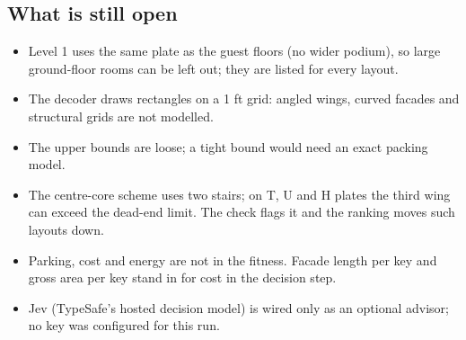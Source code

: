 \subsection{What is still open}
\begin{itemize}
\item Level 1 uses the same plate as the guest floors (no wider podium), so large ground-floor rooms can be left out; they are listed for every layout.
\item The decoder draws rectangles on a 1 ft grid: angled wings, curved facades and structural grids are not modelled.
\item The upper bounds are loose; a tight bound would need an exact packing model.
\item The centre-core scheme uses two stairs; on T, U and H plates the third wing can exceed the dead-end limit. The check flags it and the ranking moves such layouts down.
\item Parking, cost and energy are not in the fitness. Facade length per key and gross area per key stand in for cost in the decision step.
\item Jev (TypeSafe's hosted decision model) is wired only as an optional advisor; no key was configured for this run.
\end{itemize}
